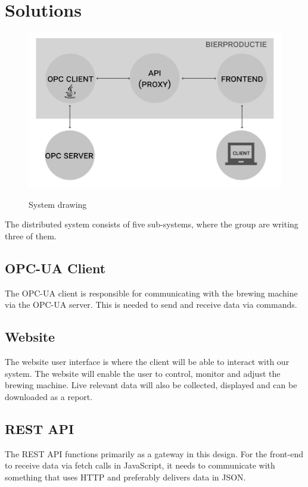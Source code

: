 \section{Solutions}
\begin{figure}[h]
\centering 
\includegraphics[scale=0.3]{images/system_drawing.pdf}
\label{figure:System_drawing}
\caption{System drawing} 
\end{figure}

The distributed system consists of five sub-systems, where the group are writing three
of them.

\subsection{OPC-UA Client}
The OPC-UA client is responsible for communicating with the brewing machine via
the OPC-UA server. This is needed to send and receive data via
commands.

\subsection{Website}
The website user interface is where the client will be able to interact with
our system. The website will enable the user to control, monitor and adjust
the brewing machine. Live relevant data will also be collected, displayed and
can be downloaded as a report.


\subsection{REST API}
The REST API functions primarily as a gateway in this design. For the
front-end to receive data via fetch calls in JavaScript, it needs to communicate 
with something that uses HTTP and preferably delivers data in JSON.

